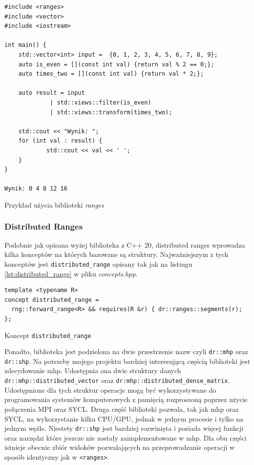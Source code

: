 \documentclass[a4paper,12pt]{book} %
\begin{document}
\begin{lstfloat}[H]
\lstset{language=C++}
\begin{lstlisting}[frame=single]
#include <ranges>
#include <vector>
#include <iostream>

int main() {
	std::vector<int> input =  {0, 1, 2, 3, 4, 5, 6, 7, 8, 9};
    auto is_even = [](const int val) {return val % 2 == 0;};
    auto times_two = [](const int val) {return val * 2;};

    auto result = input
             | std::views::filter(is_even)
             | std::views::transform(times_two);
    
    std::cout << "Wynik: ";
    for (int val : result) {
    		std::cout << val << ' ';
  	}
}

Wynik: 0 4 8 12 16
\end{lstlisting}
\caption{Przykład użycia biblioteki \emph{ranges}}\label{lst:ranges_przyklad}
\end{lstfloat}

\subsubsection{Distributed Ranges}
Podobnie jak opisana wyżej biblioteka z C++ 20, distributed ranges wprowadza kilka konceptów na których bazowane są struktury. Najważniejszym z tych konceptów jest \texttt{distributed\_range} opisany tak jak na listingu \ref{lst:distributed_range} w pliku \emph{concepts.hpp}.

\begin{lstfloat}[H]
\lstset{language=C++}
\begin{lstlisting}[frame=single]
template <typename R>
concept distributed_range =
  rng::forward_range<R> && requires(R &r) { dr::ranges::segments(r); };
\end{lstlisting}
\caption{Koncept \texttt{distributed\_range}}
\label{lst:distributed_range}
\end{lstfloat}

Ponadto, biblioteka jest podzielona na dwie przestrzenie nazw czyli \texttt{dr::mhp} oraz \texttt{dr::shp}. Na potrzeby mojego projektu bardziej interesującą częścią biblioteki jest zdecydowanie mhp. Udostępnia ona dwie struktury danych \texttt{dr::mhp::distributed\_vector} oraz \texttt{dr:mhp::distributed\_dense\_matrix}. Udostępnione dla tych struktur operacje mogą być wykorzystywane do programowania systemów komputerowych z pamięcią rozproszoną poprzez użycie połączenia MPI oraz SYCL. Druga część biblioteki pozwala, tak jak mhp oraz SYCL, na wykorzystanie kilku CPU/GPU, jednak w jednym procesie i tylko na jednym węźle. Niestety \texttt{dr::shp} jest bardziej rozwinięta i posiada więcej funkcji oraz narzędzi które jeszcze nie zostały zaimplementowane w mhp. Dla obu części istnieje obecnie zbiór widoków pozwalających na przeprowadzanie operacji w sposób identyczny jak w \texttt{<ranges>}.
\end{document}
